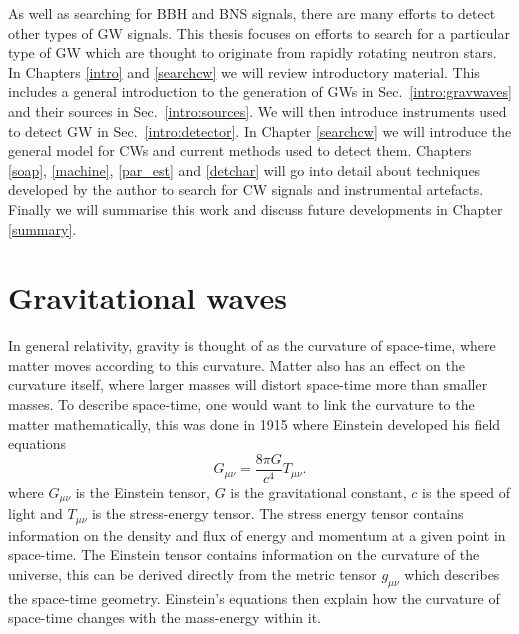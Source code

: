As well as searching for \gls{BBH} and \gls{BNS} signals, there are many
efforts to detect other types of \gls{GW} signals.  This thesis focuses on
efforts to search for a particular type of \gls{GW} which are thought to
originate from rapidly rotating neutron stars.  In Chapters \ref{intro} and
\ref{searchcw} we will review introductory material.  This includes a general
introduction to the generation of \glspl{GW} in Sec.~\ref{intro:gravwaves} and
their sources in Sec.~\ref{intro:sources}.  We will then introduce instruments
used to detect \gls{GW} in Sec.~\ref{intro:detector}.  In Chapter
\ref{searchcw} we will introduce the general model for \glspl{CW} and current
methods used to detect them.  Chapters \ref{soap}, \ref{machine}, \ref{par_est} and
\ref{detchar} will go into detail about techniques developed by the author to
search for \gls{CW} signals and instrumental artefacts.  Finally we will summarise this work and discuss
future developments in Chapter \ref{summary}.



\section{\label{intro:gravwaves}Gravitational waves}

In general relativity, gravity is thought of as the curvature of space-time, where
matter moves according to this curvature. Matter also has
an effect on the curvature itself, where larger masses will distort space-time more than smaller masses. 
To describe space-time, one would want to link the curvature to the matter mathematically, this was done in 1915 \citep{einstein2005GrundlageAllgemeinen} where Einstein developed his field equations
\begin{equation}
\label{intro:gravwaves:efe}
    G_{\mu \nu} = \frac{8 \pi G}{c^4}T_{\mu \nu}.
\end{equation}
where $G_{\mu \nu}$ is the Einstein tensor, $G$ is the gravitational constant, $c$ is the speed of light and $T_{\mu \nu}$ is the
stress-energy tensor.  The stress energy tensor contains information on the density and flux of energy and momentum at a given point in space-time.  
The Einstein tensor contains information on the curvature of the
universe, this can be derived directly from the metric tensor $g_{\mu \nu}$ which describes the space-time geometry.
Einstein's equations then explain how the curvature of space-time changes with
the mass-energy within it.  

